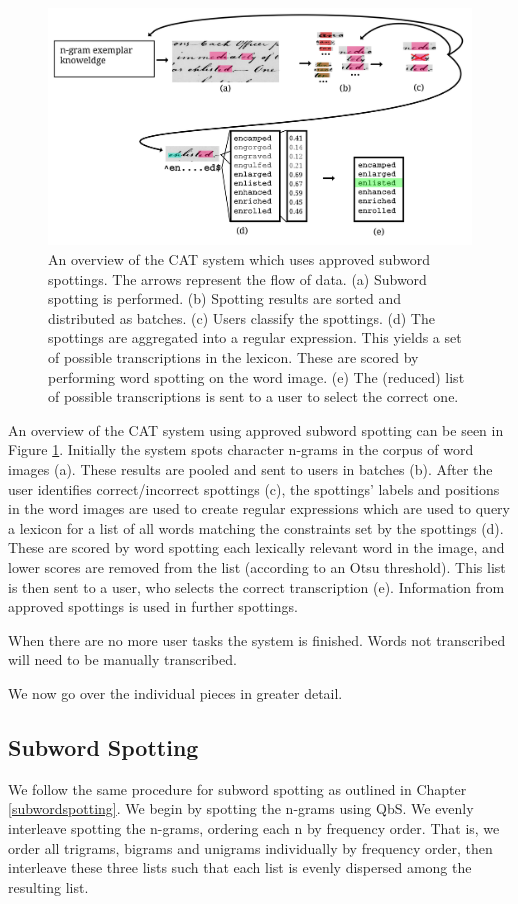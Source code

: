 \documentclass[ms,electronic,twosidetoc,letterpaper,chaptercenter,parttop,lof,lot]{byumsphd}
\begin{document}
\begin{figure}
    \centering
    \includegraphics[width=.9\textwidth]{flow6}
    \caption{An overview of the CAT system which uses approved subword spottings. The arrows represent the flow of data. (a) Subword spotting is performed. (b) Spotting results are sorted and distributed as batches. (c) Users classify the spottings. (d) The spottings are aggregated into a regular expression. This yields a set of possible transcriptions in the lexicon. These are scored by performing word spotting on the word image. (e) The (reduced) list of possible transcriptions is sent to a user to select the correct one.}
    \label{fig:flow}
\end{figure}
An overview of the CAT system using approved subword spotting can be seen in Figure \ref{fig:flow}.  Initially the system spots character n-grams in the corpus of word images (a). These results are pooled and sent to users in batches (b). After the user identifies correct/incorrect spottings (c), the spottings' labels and positions in the word images are used to create regular expressions which are used to query a lexicon for a list of all words matching the constraints set by the spottings (d). These are scored by word spotting each lexically relevant word in the image, and lower scores are removed from the list (according to an Otsu threshold). This list is then sent to a user, who selects the correct transcription (e). Information from approved spottings is used in further spottings.

When there are no more user tasks the system is finished. Words not transcribed will need to be manually transcribed.

We now go over the individual pieces in greater detail.

\subsection{Subword Spotting}
We follow the same procedure for subword spotting as outlined in Chapter \ref{subwordspotting}. We begin by spotting the n-grams using QbS. We evenly interleave spotting the n-grams, ordering each n by frequency order. That is, we order all trigrams, bigrams and unigrams individually by frequency order, then interleave these three lists such that each list is evenly dispersed among the resulting list. 
\end{document}
